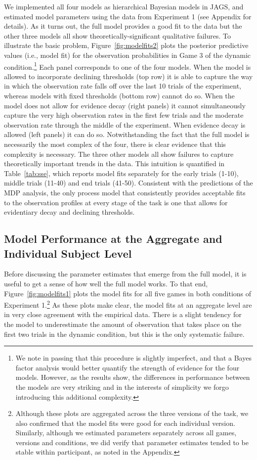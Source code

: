 \documentclass[authoryear]{elsarticle}
\newcommand{\subsectionX}[1]{\subsection{#1}}
\begin{document}
We implemented all four models as hierarchical Bayesian models in JAGS, and estimated model parameters using the data from Experiment 1 (see Appendix for details). As it turns out, the full model provides a good fit to the data but the other three models all show theoretically-significant qualitative failures. To illustrate the basic problem, Figure~\ref{fig:modelfits2} plots the posterior predictive values (i.e., model fit) for the observation probabilities in Game 3 of the dynamic condition.\footnote{We note in passing that this procedure is slightly imperfect, and that a Bayes factor analysis would better quantify the strength of evidence for the four models. However, as the results show, the differences in performance between the models are very striking and in the interests of simplicity we forgo introducing this additional complexity.} Each panel corresponds to one of the four models. When the model is allowed to incorporate declining thresholds (top row) it is able to capture the way in which the observation rate falls off over the last 10 trials of the experiment, whereas models with fixed thresholds (bottom row) cannot do so. When the model does not allow for evidence decay (right panels) it cannot simultaneously capture the very high observation rates in the first few trials and the moderate observation rate through the middle of the experiment. When evidence decay is allowed (left panels) it can do so. Notwithstanding the fact that the full model is necessarily the most complex of the four, there is clear evidence that this complexity is necessary. The three other models all show failures to capture theoretically important trends in the data. This intuition is quantified in Table~\ref{tab:sse}, which reports model fits separately for the early trials (1-10), middle trials (11-40) and end trials (41-50). Consistent with the predictions of the MDP analysis, the only process model that consistently provides acceptable fits to the observation profiles at every stage of the task is one that allows for evidentiary decay and declining thresholds.


\subsectionX{Model Performance at the Aggregate and Individual Subject Level}

Before discussing the parameter estimates that emerge from the full model, it is useful to get a sense of how well the full model works.  To that end, Figure~\ref{fig:modelfits1} plots the model fits for all five games in both conditions of Experiment 1.\footnote{Although these plots are aggregated across the three versions of the task, we also confirmed that the model fits were good for each individual version. Similarly, although we estimated parameters separately across all games, versions and conditions, we did verify that parameter estimates tended to be stable within participant, as noted in the Appendix.} As these plots make clear, the model fits at an aggregate level are in very close agreement with the empirical data. There is a slight tendency for the model to underestimate the amount of observation that takes place on the first two trials in the dynamic condition, but this is the only systematic failure.
\end{document}
